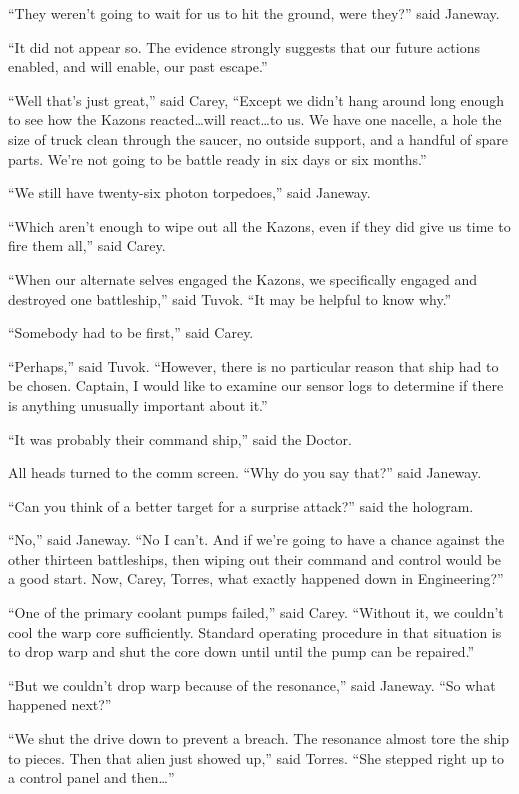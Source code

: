 \documentclass[twoside,letterpaper,12pt]{memoir}
\begin{document}
``They weren't going to wait for us to hit the ground, were they?'' said Janeway. 

``It did not appear so. The evidence strongly suggests that our future actions enabled, and will enable, our past escape.'' 

``Well that's just great,'' said Carey, ``Except we didn't hang around long enough to see how the Kazons reacted\ldots will react\ldots to us. We have one nacelle, a hole the size of truck clean through the saucer, no outside support, and a handful of spare parts. We're not going to be battle ready in six days or six months.'' 

``We still have twenty-six photon torpedoes,'' said Janeway. 

``Which aren't enough to wipe out all the Kazons, even if they did give us time to fire them all,'' said Carey. 

``When our alternate selves engaged the Kazons, we specifically engaged and destroyed one battleship,'' said Tuvok. ``It may be helpful to know why.'' 

``Somebody had to be first,'' said Carey. 

``Perhaps,'' said Tuvok. ``However, there is no particular reason that ship had to be chosen. Captain, I would like to examine our sensor logs to determine if there is anything unusually important about it.'' 

``It was probably their command ship,'' said the Doctor. 

All heads turned to the comm screen. ``Why do you say that?'' said Janeway. 

``Can you think of a better target for a surprise attack?'' said the hologram. 

``No,'' said Janeway. ``No I can't. And if we're going to have a chance against the other thirteen battleships, then wiping out their command and control would be a good start. Now, Carey, Torres, what exactly happened down in Engineering?'' 

``One of the primary coolant pumps failed,'' said Carey. ``Without it, we couldn't cool the warp core sufficiently. Standard operating procedure in that situation is to drop warp and shut the core down until until the pump can be repaired.'' 

``But we couldn't drop warp because of the resonance,'' said Janeway. ``So what happened next?'' 

``We shut the drive down to prevent a breach. The resonance almost tore the ship to pieces. Then that alien just showed up,'' said Torres. ``She stepped right up to a control panel and then\ldots '' 
\end{document}
